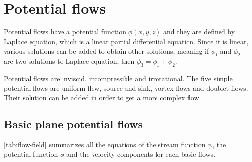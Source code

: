 \documentclass[10pt, twocolumn]{article}
\begin{document}
\section{Potential flows}
Potential flows have a potential function \(\phi(x,y,z)\) and they are defined by Laplace equation, which is a linear partial differential equation.
Since it is linear, various solutions can be added to obtain other solutions, meaning if \(\phi_1\) and \(\phi_2\) are two solutions to Laplace equation, then \(\phi_3 = \phi_1 + \phi_2\).

Potential flows are inviscid, incompressible and irrotational.
The five simple potential flows are uniform flow, source and sink, vortex flows and doublet flows.
Their solution can be added in order to get a more complex flow.


\subsection{Basic plane potential flows}
\vref{tab:flow-field} summarizes all the equations of the stream function \(\psi\), the potential function \(\phi\) and the velocity components for each basic flows.
\end{document}
